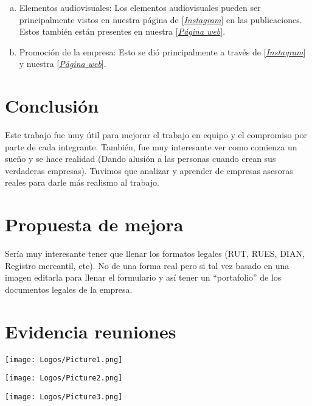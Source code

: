 \documentclass[10pt]{article}
\begin{document}
\begin{enumerate}[a)]
    \item Elementos audiovisuales: Los elementos audiovisuales pueden ser principalmente vistos en nuestra página de [\textit{\href{https://www.instagram.com/bigideasde1/}{Instagram}}] en las publicaciones. Estos también están presentes en nuestra [\textit{\href{https://vvisgal2.wixsite.com/bigideas/}{Página web}}].
    \item Promoción de la empresa: Esto se dió principalmente a través de [\textit{\href{https://www.instagram.com/bigideasde1/}{Instagram}}] y nuestra [\textit{\href{https://vvisgal2.wixsite.com/bigideas/}{Página web}}].
\end{enumerate}

\section{Conclusión}

Este trabajo fue muy útil para mejorar el trabajo en equipo y el compromiso por parte de cada integrante. También, fue muy interesante ver como comienza un sueño y se hace realidad (Dando alusión a las personas cuando crean sus verdaderas empresas). Tuvimos que analizar y aprender de empresas asesoras reales para darle más realismo al trabajo.

\section{Propuesta de mejora}

Sería muy interesante tener que llenar los formatos legales (RUT, RUES, DIAN, Registro mercantil, etc). No de una forma real pero si tal vez basado en una imagen editarla para llenar el formulario y así tener un “portafolio” de los documentos legales de la empresa.

\section{Evidencia reuniones}

\texttt{[image: Logos/Picture1.png]}

\texttt{[image: Logos/Picture2.png]}

\texttt{[image: Logos/Picture3.png]}
\end{document}
